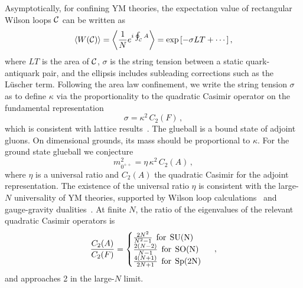 \documentclass[prl,aps,
showpacs,
preprint,
nofootinbib,
floatfix,
superscriptaddress, showkeys
]{revtex4-1}
\begin{document}
Asymptotically, for  confining YM theories, the expectation value of rectangular Wilson loops
${\cal C}$ can be written as 
\begin{equation}
\left<W({\cal C})\right>=\left<\frac{1}{N}e^{i\oint_{\cal C}A}\right>=\exp\left[-\sigma LT+\cdots\right],
\label{area}
\end{equation}
where $LT$ is the area of  ${\cal C}$, $\sigma$ is the string tension between a static quark-antiquark pair,
and the ellipsis includes subleading corrections such as the L\"uscher term. 
Following the area law confinement, we write the string tension $\sigma$  as to define $\kappa$ via the proportionality to the quadratic Casimir operator on the 
fundamental representation
\begin{equation}
\sigma=\kappa^2\,C_2(F)\,,
\end{equation}
which is consistent with lattice results~\cite{Lucini:2001nv,Bali:2000un,Deldar:1999vi,Cardoso:2011cs,Lucini:2004my,Bringoltz:2008nd}.
The glueball is a bound state of adjoint gluons. On dimensional grounds,  its mass should be proportional to $\kappa$. 
For the ground state glueball we conjecture
\begin{equation}
m_{0^{++}}^2=\eta\,\kappa^2\,C_2(A)\,,
\end{equation}
where $\eta$ is  a universal ratio and $C_2(A)$  the quadratic Casimir for the adjoint representation.
The existence of the universal ratio $\eta$ is consistent with the large-$N$ universality of YM theories, 
supported by   Wilson loop calculations~\cite{Lovelace:1982hz} and 
gauge-gravity dualities~\cite{Imoto:2009bf}.
At finite $N$, the ratio of the eigenvalues of the relevant quadratic Casimir operators is~\cite{Slansky:1981yr} 
\begin{equation}
\frac{C_2(A)}{C_2(F)}=
\begin{cases} \frac{2N^2}{N^2-1}\;\,\text{for}\,\; \rm{SU}(N)\\
\frac{2(N-2)}{N-1}\;\,\text{for}\,\; \rm{SO}(N)\\
\frac{4(N+1)}{2N+1}\;\,\text{for}\,\; \rm{Sp}(2N)\,
\end{cases}\,,
\end{equation}
and  approaches 2 in the large-$N$ limit. 
\end{document}
